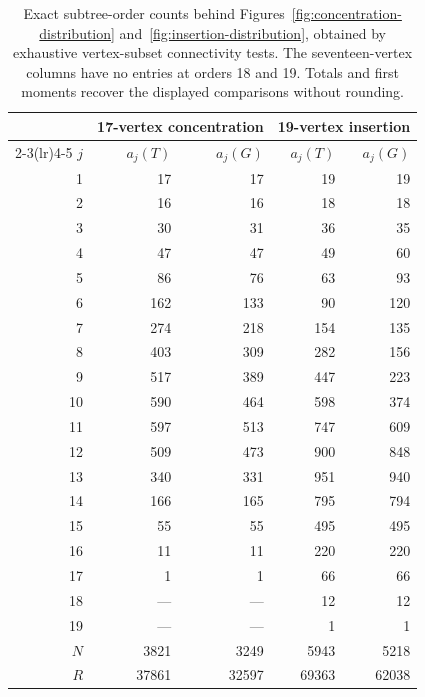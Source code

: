 \documentclass[11pt,reqno]{amsart}
\renewcommand{\arraystretch}{1.12}
\theoremstyle{plain}
\begin{document}
\begin{table}[htbp]
\caption{\small Exact subtree-order counts behind Figures~\ref{fig:concentration-distribution} and~\ref{fig:insertion-distribution}, obtained by exhaustive vertex-subset connectivity tests. The seventeen-vertex columns have no entries at orders 18 and 19. Totals and first moments recover the displayed comparisons without rounding.}
\label{tab:exact-distributions}
\centering\footnotesize
\setlength{\tabcolsep}{10pt}
\renewcommand{\arraystretch}{1.05}
\begin{tabular}{@{}rrrrr@{}}
\toprule
 & \multicolumn{2}{c}{17-vertex concentration} & \multicolumn{2}{c}{19-vertex insertion} \\
\cmidrule(lr){2-3}\cmidrule(lr){4-5}
$j$ & $a_j(T)$ & $a_j(G)$ & $a_j(T)$ & $a_j(G)$ \\
\midrule
1 & 17 & 17 & 19 & 19 \\
2 & 16 & 16 & 18 & 18 \\
3 & 30 & 31 & 36 & 35 \\
4 & 47 & 47 & 49 & 60 \\
5 & 86 & 76 & 63 & 93 \\
6 & 162 & 133 & 90 & 120 \\
7 & 274 & 218 & 154 & 135 \\
8 & 403 & 309 & 282 & 156 \\
9 & 517 & 389 & 447 & 223 \\
10 & 590 & 464 & 598 & 374 \\
11 & 597 & 513 & 747 & 609 \\
12 & 509 & 473 & 900 & 848 \\
13 & 340 & 331 & 951 & 940 \\
14 & 166 & 165 & 795 & 794 \\
15 & 55 & 55 & 495 & 495 \\
16 & 11 & 11 & 220 & 220 \\
17 & 1 & 1 & 66 & 66 \\
18 & --- & --- & 12 & 12 \\
19 & --- & --- & 1 & 1 \\
\midrule
$N$ & 3821 & 3249 & 5943 & 5218 \\
$R$ & 37861 & 32597 & 69363 & 62038 \\
\bottomrule
\end{tabular}
\end{table}
\FloatBarrier
\end{document}
